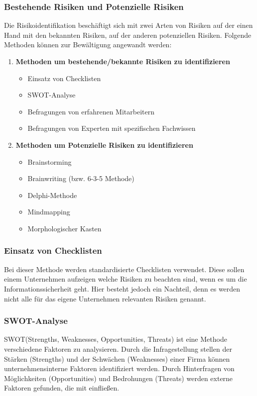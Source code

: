 \subsubsection{Bestehende Risiken und Potenzielle Risiken}
Die Risikoidentifikation beschäftigt sich mit zwei Arten von Risiken auf der einen Hand mit den bekannten Risiken, auf der anderen potenziellen Risiken. Folgende Methoden können zur Bewältigung angewandt werden:
\begin{enumerate}
    \item \textbf{Methoden um bestehende/bekannte Risiken zu identifizieren}
    \begin{itemize}
        \item Einsatz von Checklisten
        \item SWOT-Analyse
        \item Befragungen von erfahrenen Mitarbeitern
        \item Befragungen von Experten mit spezifischen Fachwissen
    \end{itemize}
    \item \textbf{Methoden um Potenzielle Risiken zu identifizieren}
    \begin{itemize}
    	\item Brainstorming
    	\item Brainwriting (bzw. 6-3-5 Methode)
    	\item Delphi-Methode
    	\item Mindmapping
    	\item Morphologischer Kasten
    \end{itemize}
\end{enumerate}

\subsubsection{Einsatz von Checklisten}
Bei dieser Methode werden standardisierte Checklisten verwendet. Diese sollen einem Unternehmen aufzeigen welche Risiken zu beachten sind, wenn es um die Informationssicherheit geht. Hier besteht jedoch ein Nachteil, denn es werden nicht alle für das eigene Unternehmen relevanten Risiken genannt.

\subsubsection{SWOT-Analyse}
SWOT(Strengths, Weaknesses, Opportunities, Threats) ist eine Methode verschiedene Faktoren zu analysieren. 
Durch die Infragestellung stellen der Stärken (Strengths) und der Schwächen (Weaknesses) einer Firma können unternehmensinterne Faktoren identifiziert werden.
Durch Hinterfragen von Möglichkeiten (Opportunities) und Bedrohungen (Threats) werden externe Faktoren gefunden, die mit einfließen.


